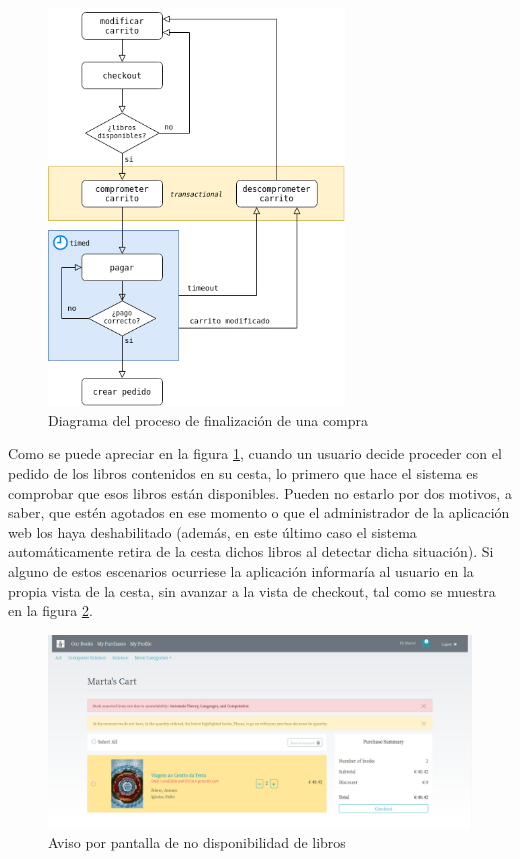 \documentclass[a4paper]{article}
\begin{document}
    \begin{figure}[hbt!]
    	\centering
    	\includegraphics[width=0.7\textwidth,keepaspectratio]{cart_concurrent}
    	\caption{Diagrama del proceso de finalización de una compra}
    	\label{fig:cart_concurrent}
    \end{figure}
    
    Como se puede apreciar en la figura \ref{fig:cart_concurrent}, cuando un usuario decide proceder con el pedido de los libros contenidos en su cesta, lo primero que hace el sistema es comprobar que esos libros están disponibles. Pueden no estarlo por dos motivos, a saber, que estén agotados en ese momento o que el administrador de la aplicación web los haya deshabilitado (además, en este último caso el sistema automáticamente retira de la cesta dichos libros al detectar dicha situación). Si alguno de estos escenarios ocurriese la aplicación informaría al usuario en la propia vista de la cesta, sin avanzar a la vista de checkout, tal como se muestra en la figura \ref{fig:cart_alert}.
    
    \begin{figure}[hbt!]
    	\centering
    	\includegraphics[width=\textwidth]{cart_alert}
    	\caption{Aviso por pantalla de no disponibilidad de libros}
    	\label{fig:cart_alert}
    \end{figure}
    
\end{document}
